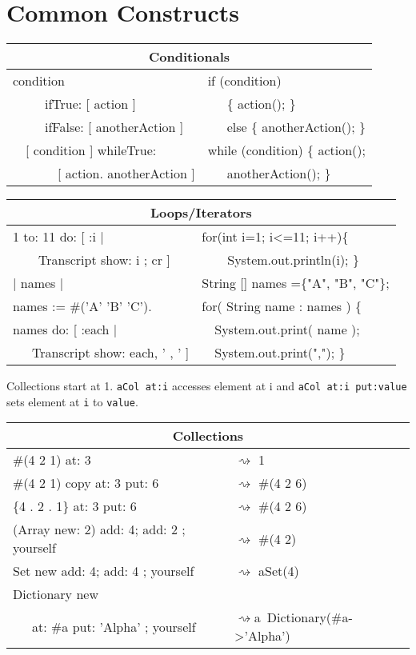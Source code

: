 \documentclass[notumble]{leaflet}
\newcommand{\ct}[1]{{\textsf{#1}}\xspace}
\newcommand{\code}[1]{\foreignlanguage{english}{\texttt{#1}}}
\begin{document}
\vspace{-0.3cm}
\section{Common Constructs}

\noindent
\begin{tabularx}{\linewidth}{@{}lX@{}}
        \toprule
        \multicolumn{2}{c}{\textbf{Conditionals}}\\
        \midrule
        
condition&if (condition) \\
\ \ \ \ \    ifTrue: [ action ] &      \ \ \   \{ action(); \} \\
\ \ \ \ \  ifFalse: [ anotherAction ]&   \ \ \     else \{ anotherAction(); \}\\
\midrule
\ \  [ condition ] whileTrue:&while (condition) \{ action();\\
\ \ \ \ \ \ \  [ action. anotherAction ]&\ \ \     anotherAction(); \}\\
\end{tabularx}

\noindent
\begin{tabularx}{\linewidth}{@{}lX@{}}
        \toprule
        \multicolumn{2}{c}{\textbf{Loops/Iterators}}\\
\midrule
1 to: 11 do: [ :i | &for(int i=1; i<=11; i++)\{ \\
\ \ \ \ Transcript show: i ; cr ]&\ \ \ \    System.out.println(i); \}\\
  \midrule
| names | &String [] names =\{"A", "B", "C"\};\\  
names := \#('A' 'B' 'C').&for( String name : names ) \{\\
names do: [ :each |&\ \      System.out.print( name );\\
 \ \ \ Transcript show: each, ' , ' ]&\ \     System.out.print(","); \} \\
\midrule
\end{tabularx}

Collections start at 1. \code{aCol~at:i} accesses element at \ct{i} and \code{aCol at:i put:value} sets element at \code{i} to \code{value}.

\noindent
\begin{tabularx}{\linewidth}{@{}lX@{}}
     \toprule
      \multicolumn{2}{c}{\textbf{Collections}}\\
      \midrule
    \#(4 2 1) at: 3& $\rightsquigarrow$ 1 \\
   \#(4 2 1) copy at: 3 put: 6& $\rightsquigarrow$ \#(4 2 6) \\
   \{4 . 2 . 1\} at: 3 put: 6& $\rightsquigarrow$ \#(4 2 6) \\
     \midrule
    (Array new: 2) add: 4; add: 2 ; yourself& $\rightsquigarrow$ \#(4 2) \\
    Set new add: 4; add: 4 ; yourself&$\rightsquigarrow$ aSet(4) \\
    Dictionary new& \\
    \ \ \ at: \#a put: 'Alpha' ; yourself&$\rightsquigarrow$a~Dictionary(\#a->'Alpha')\\
     \midrule
\end{tabularx}
\end{document}
